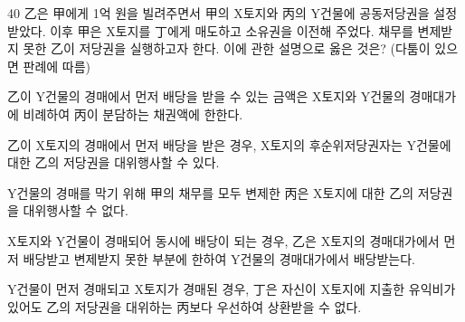 \begin{question}{40}
乙은 甲에게 1억 원을 빌려주면서 甲의 X토지와 丙의 Y건물에 공동저당권을 설정받았다. 이후 甲은 X토지를 丁에게 매도하고 소유권을 이전해 주었다. 채무를 변제받지 못한 乙이 저당권을 실행하고자 한다. 이에 관한 설명으로 옳은 것은? (다툼이 있으면 판례에 따름)
\begin{choices}
  \item 乙이 Y건물의 경매에서 먼저 배당을 받을 수 있는 금액은 X토지와 Y건물의 경매대가에 비례하여 丙이 분담하는 채권액에 한한다.
  \item 乙이 X토지의 경매에서 먼저 배당을 받은 경우, X토지의 후순위저당권자는 Y건물에 대한 乙의 저당권을 대위행사할 수 있다.
  \item Y건물의 경매를 막기 위해 甲의 채무를 모두 변제한 丙은 X토지에 대한 乙의 저당권을 대위행사할 수 없다.
  \item X토지와 Y건물이 경매되어 동시에 배당이 되는 경우, 乙은 X토지의 경매대가에서 먼저 배당받고 변제받지 못한 부분에 한하여 Y건물의 경매대가에서 배당받는다.
  \item Y건물이 먼저 경매되고 X토지가 경매된 경우, 丁은 자신이 X토지에 지출한 유익비가 있어도 乙의 저당권을 대위하는 丙보다 우선하여 상환받을 수 없다.
\end{choices}
\end{question}
